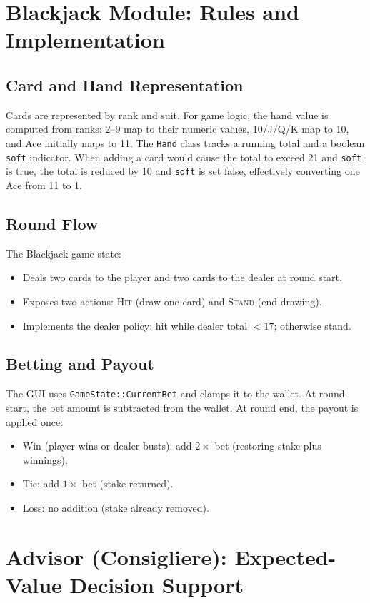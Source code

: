 \documentclass[conference]{IEEEtran}
\begin{document}
\section{Blackjack Module: Rules and Implementation}
\subsection{Card and Hand Representation}
Cards are represented by rank and suit.
For game logic, the hand value is computed from ranks:
2--9 map to their numeric values, 10/J/Q/K map to 10, and Ace initially maps to 11.
The \texttt{Hand} class tracks a running total and a boolean \texttt{soft} indicator.
When adding a card would cause the total to exceed 21 and \texttt{soft} is true, the total is reduced by 10 and \texttt{soft} is set false, effectively converting one Ace from 11 to 1.

\subsection{Round Flow}
The Blackjack game state:
\begin{itemize}
  \item Deals two cards to the player and two cards to the dealer at round start.
  \item Exposes two actions: \textsc{Hit} (draw one card) and \textsc{Stand} (end drawing).
  \item Implements the dealer policy: hit while dealer total $< 17$; otherwise stand.
\end{itemize}

\subsection{Betting and Payout}
The GUI uses \texttt{GameState::CurrentBet} and clamps it to the wallet.
At round start, the bet amount is subtracted from the wallet.
At round end, the payout is applied once:
\begin{itemize}
  \item Win (player wins or dealer busts): add $2\times$ bet (restoring stake plus winnings).
  \item Tie: add $1\times$ bet (stake returned).
  \item Loss: no addition (stake already removed).
\end{itemize}

\section{Advisor (Consigliere): Expected-Value Decision Support}
\end{document}
